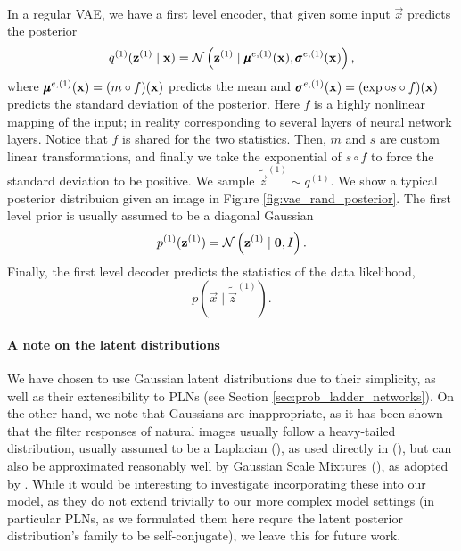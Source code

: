 \paragraph{}
In a regular VAE, we have a first level encoder, that given some input
$\vec{x}$ predicts the posterior
\[
  q^{(1)}(\mathbf{z}^{(1)} \mid \mathbf{x}) = \mathcal{N}\left( \mathbf{z}^{(1)} \mid
  \pmb{\mu}^{e, (1)}(\mathbf{x}), \pmb{\sigma}^{e, (1)}(\mathbf{x}) \right),
\]
where $\pmb{\mu}^{e, (1)}(\mathbf{x}) = (m \circ f)(\mathbf{x})$ predicts the mean and
$\pmb{\sigma}^{e, (1)}(\mathbf{x}) = (\exp \circ s \circ f)(\mathbf{x})$ predicts the
standard deviation of the posterior. Here $f$ is a highly nonlinear mapping of
the input; in reality corresponding to several layers of neural network
layers. Notice that $f$ is shared for the two statistics. Then, $m$ and $s$ are
custom linear transformations, and finally we take the exponential of $s \circ f
$ to force the standard deviation to be positive. We sample $\tilde{\vec{z}}^{(1)}
\sim q^{(1)}$. We show a typical posterior distribuion given an image in Figure
\ref{fig:vae_rand_posterior}.
The first level prior is usually assumed to be a diagonal Gaussian
\[
  p^{(1)}(\mathbf{z}^{(1)})  = \mathcal{N}\left( \mathbf{z}^{(1)} \mid \mathbf{0}, I \right).
\]
Finally, the first level decoder predicts the statistics of the data likelihood,
\[
  p(\vec{x} \mid \tilde{\vec{z}}^{(1)}).
\]

\paragraph{A note on the latent distributions} We have chosen to use Gaussian
latent distributions due to their simplicity, as well as their extenesibility to
PLNs (see Section \ref{sec:prob_ladder_networks}). On the other hand, we note
that Gaussians are inappropriate, as it has been shown that the filter responses
of natural images usually follow a heavy-tailed distribution, usually assumed to
be a Laplacian (\cite{jain1989fundamentals}), as used directly in
(\cite{clic2018winner}), but can also be approximated reasonably well by Gaussian
Scale Mixtures (\cite{portilla2003image}), as adopted by \cite{theis2017lossy}.
While it would be interesting to investigate incorporating these into our
model, as they do not extend trivially to our more complex model settings (in
particular PLNs, as we formulated them here requre the latent posterior
distribution's family to be self-conjugate), we leave this for future work.




